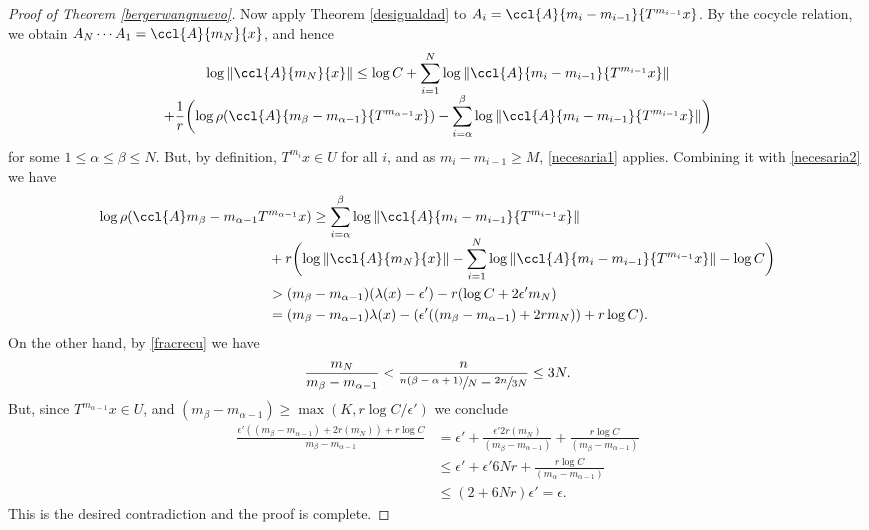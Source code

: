 \begin{proof}[Proof of Theorem \ref{bergerwangnuevo}]
Now apply Theorem \ref{desigualdad} to $A_{i}=\ccl{A}{m_i-m_{i-1}}{T^{m_{i-1}}x}$. By the cocycle relation, we obtain $A_{N}\cdots A_{1}=\ccl{A}{m_N}{x}$, and hence
\begin{multline}\label{necesaria2}
\log{\|\ccl{A}{m_N}{x}\|} \leq \log{C}+\sum_{i=1}^{N}{\log{\|\ccl{A}{m_i-m_{i-1}}{T^{m_{i-1}}x}\|}} \\[-5pt]
+ \frac{1}{r}\biggl(\log{\rho(\ccl{A}{m_{\beta}-m_{\alpha-1}}{T^{m_{\alpha-1}}x})}-\sum_{i=\alpha}^{\beta}{\log{\|\ccl{A}{m_i-m_{i-1}}{T^{m_{i-1}}x}\|}}\biggr)
\end{multline}
for some $1\leq \alpha\leq \beta\leq N$. But, by definition, $T^{m_i}x\!\in\!U$ for all $i$, and as \hbox{$m_i-m_{i-1}\!\geq\!M$}, \eqref{necesaria1} applies. Combining it with \eqref{necesaria2} we have
\begin{equation*}
\begin{split}
\log\rho(\ccl{A}m_{\beta}-m_{\alpha-1}T&^{m_{\alpha-1}}x) \geq
\sum_{i=\alpha}^{\beta}{\log{\|\ccl{A}{m_i-m_{i-1}}{T^{m_{i-1}}x}\|}} \\[-5pt]
& +r\biggl( \log{\|\ccl{A}{m_N}{x}\|}-\sum_{i=1}^{N}{\log{\|\ccl{A}{m_i-m_{i-1}}{T^{m_{i-1}}x}\|}} -\log{C} \biggr)\\
& > (m_{\beta}-m_{\alpha-1})(\lambda(x)-\epsilon')-r(\log{C}+2\epsilon'm_N)\\
& = (m_{\beta}-m_{\alpha-1})\lambda(x)-( \epsilon'((m_{\beta}-m_{\alpha-1})+2rm_N))+r\log{C}).
\end{split}
\end{equation*}
On the other hand, by \eqref{fracrecu} we have
\begin{equation*}
\frac{m_N}{m_{\beta}-m_{\alpha-1}}<\frac{n}{\sfrac{n(\beta-\alpha+1)}{N}-\sfrac{2n}{3N}}\leq 3N.
\end{equation*}
But, since $T^{m_{\alpha-1}}x\in U$, and $(m_{\beta}-m_{\alpha-1})\geq \max(K,r\log{C}/\epsilon')$ we conclude
\begin{equation*}
\begin{split}
\frac{\epsilon'((m_{\beta}-m_{\alpha-1})+2r(m_N))+r\log{C} }{m_{\beta}-m_{\alpha-1}} & = \epsilon'+\frac{\epsilon'2r(m_N)}{(m_{\beta}-m_{\alpha-1})}+\frac{r\log{C}}{(m_{\beta}-m_{\alpha-1})} \\
& \leq \epsilon'+\epsilon'6Nr+\frac{r\log{C}}{(m_{\alpha}-m_{\alpha-1})}\\
& \leq (2+6Nr)\epsilon'=\epsilon.
\end{split}
\end{equation*}
This is the desired contradiction and the proof is complete.
\end{proof}

